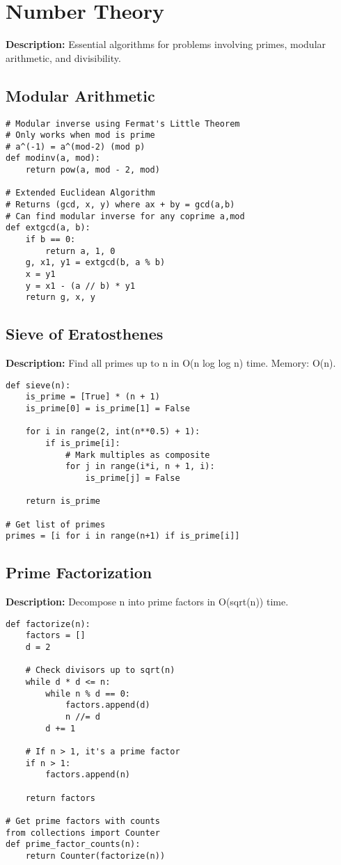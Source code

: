 \section{Number Theory}

\textbf{Description:} Essential algorithms for problems involving primes, modular arithmetic, and divisibility.

\subsection{Modular Arithmetic}
\begin{lstlisting}
# Modular inverse using Fermat's Little Theorem
# Only works when mod is prime
# a^(-1) = a^(mod-2) (mod p)
def modinv(a, mod):
    return pow(a, mod - 2, mod)

# Extended Euclidean Algorithm
# Returns (gcd, x, y) where ax + by = gcd(a,b)
# Can find modular inverse for any coprime a,mod
def extgcd(a, b):
    if b == 0:
        return a, 1, 0
    g, x1, y1 = extgcd(b, a % b)
    x = y1
    y = x1 - (a // b) * y1
    return g, x, y
\end{lstlisting}

\subsection{Sieve of Eratosthenes}
\textbf{Description:} Find all primes up to n in O(n log log n) time. Memory: O(n).

\begin{lstlisting}
def sieve(n):
    is_prime = [True] * (n + 1)
    is_prime[0] = is_prime[1] = False
    
    for i in range(2, int(n**0.5) + 1):
        if is_prime[i]:
            # Mark multiples as composite
            for j in range(i*i, n + 1, i):
                is_prime[j] = False
    
    return is_prime

# Get list of primes
primes = [i for i in range(n+1) if is_prime[i]]
\end{lstlisting}

\subsection{Prime Factorization}
\textbf{Description:} Decompose n into prime factors in O(sqrt(n)) time.

\begin{lstlisting}
def factorize(n):
    factors = []
    d = 2
    
    # Check divisors up to sqrt(n)
    while d * d <= n:
        while n % d == 0:
            factors.append(d)
            n //= d
        d += 1
    
    # If n > 1, it's a prime factor
    if n > 1:
        factors.append(n)
    
    return factors

# Get prime factors with counts
from collections import Counter
def prime_factor_counts(n):
    return Counter(factorize(n))
\end{lstlisting}
